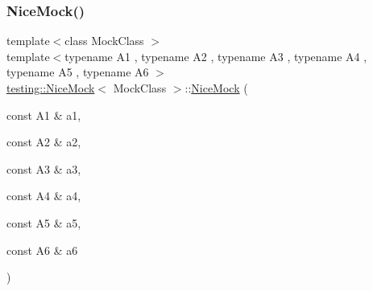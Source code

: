 \mbox{\label{classtesting_1_1NiceMock_a156d0fce85ac08abffdf4aa0c3975f81}} 
\subsubsection{\texorpdfstring{NiceMock()}{NiceMock()}\hspace{0.1cm}{\footnotesize\ttfamily [7/11]}}
{\footnotesize\ttfamily template$<$class Mock\+Class $>$ \\
template$<$typename A1 , typename A2 , typename A3 , typename A4 , typename A5 , typename A6 $>$ \\
\mbox{\hyperlink{classtesting_1_1NiceMock}{testing\+::\+Nice\+Mock}}$<$ Mock\+Class $>$\+::\mbox{\hyperlink{classtesting_1_1NiceMock}{Nice\+Mock}} (\begin{DoxyParamCaption}\item[{const A1 \&}]{a1,  }\item[{const A2 \&}]{a2,  }\item[{const A3 \&}]{a3,  }\item[{const A4 \&}]{a4,  }\item[{const A5 \&}]{a5,  }\item[{const A6 \&}]{a6 }\end{DoxyParamCaption})\hspace{0.3cm}{\ttfamily [inline]}}

\mbox{\label{classtesting_1_1NiceMock_a946d75ece1fa3a066b7d9d6ab7828c55}} 
